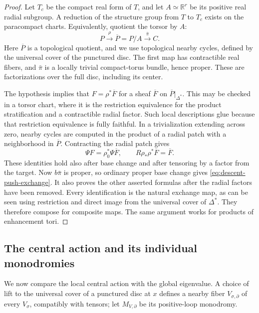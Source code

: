 \begin{proof}
Let $T_c$ be the compact real form of $T$, and let
$A\simeq\mathbb R^r$ be its positive real radial subgroup.  A
reduction of the structure group from $T$ to $T_c$ exists on the
paracompact charts.  Equivalently, quotient the torsor by $A$:
\[
 P\xrightarrow{\rho}\overline P=P/A\xrightarrow{\bar\pi}C.
\]
Here $\overline P$ is a topological quotient, and we use topological
nearby cycles, defined by the universal cover of the punctured disc.
The first map has contractible real fibers, and $\bar\pi$ is a
locally trivial compact-torus bundle, hence proper.  These are
factorizations over the full disc, including its center.

The hypothesis implies that $F=\rho^*\overline F$ for a sheaf
$\overline F$ on $\overline P|_{\Delta^*}$.  This may be checked in a
torsor chart, where it is the restriction equivalence for the product
stratification and a contractible radial factor.  Such local
descriptions glue because that restriction equivalence is fully
faithful.  In a trivialization extending across zero, nearby cycles
are computed in the product of a radial patch with a neighborhood in
$\overline P$.  Contracting the radial patch gives
\[
 \Psi F=\rho_0^*\Psi\overline F,
 \qquad R\rho_*\rho^*\overline F=\overline F.
\]
These identities hold also after base change and after tensoring by
a factor from the target.  Now $b\bar\pi$ is proper, so ordinary
proper base change gives \eqref{eq:descent-push-exchange}.
It also proves the other asserted formulas after the radial factors
have been removed.  Every identification is the natural exchange
map, as can be seen using restriction and direct image from the
universal cover of $\Delta^*$.  They therefore compose for composite
maps.  The same argument works for products of enhancement tori.
\end{proof}

\subsection{The central action and its individual monodromies}

We now compare the local central action with the global eigenvalue.  A choice of
lift to the universal cover of a punctured disc at $x$ defines a
nearby fiber $V_{\sigma,\partial}$ of every $V_\sigma$, compatibly with
tensors; let $M_{V,\partial}$ be its positive-loop monodromy.

